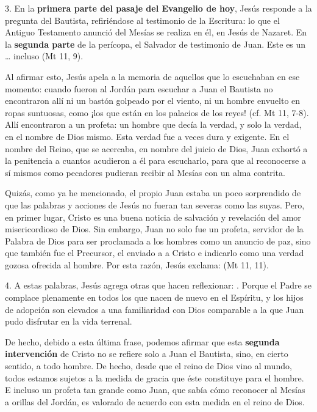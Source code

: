 \begin{body}
					3. En la \textbf{primera parte del pasaje del Evangelio de hoy}, Jesús responde a la pregunta del Bautista, refiriéndose al testimonio de la Escritura: lo que el Antiguo Testamento anunció del Mesías se realiza en él, en Jesús de Nazaret. En la \textbf{segunda parte} de la perícopa, el Salvador de testimonio de Juan. Este es un  \ldots{} incluso  (Mt 11, 9).
					
					Al afirmar esto, Jesús apela a la memoria de aquellos que lo escuchaban en ese momento: cuando fueron al Jordán para escuchar a Juan el Bautista no encontraron allí ni un bastón golpeado por el viento, ni un hombre envuelto en ropas suntuosas, como ¡los que están en los palacios de los reyes! (cf. Mt 11, 7-8). Allí encontraron a un profeta: un hombre que decía la verdad, y solo la verdad, en el nombre de Dios mismo. Esta verdad fue a veces dura y exigente. En el nombre del Reino, que se acercaba, en nombre del juicio de Dios, Juan exhortó a la penitencia a cuantos acudieron a él para escucharlo, para que al reconocerse a sí mismos como pecadores pudieran recibir al Mesías con un alma contrita.
					
					Quizás, como ya he mencionado, el propio Juan estaba un poco sorprendido de que las palabras y acciones de Jesús no fueran tan severas como las suyas. Pero, en primer lugar, Cristo es una buena noticia de salvación y revelación del amor misericordioso de Dios. Sin embargo, Juan no solo fue un profeta, servidor de la Palabra de Dios para ser proclamada a los hombres como un anuncio de paz, sino que también fue el Precursor, el enviado a  a Cristo e indicarlo como una verdad gozosa ofrecida al hombre. Por esta razón, Jesús exclama:  (Mt 11, 11).
					
					4. A estas palabras, Jesús agrega otras que hacen reflexionar: . Porque el Padre se complace plenamente en todos los que nacen de nuevo en el Espíritu, y los hijos de adopción son elevados a una familiaridad con Dios comparable a la que Juan pudo disfrutar en la vida terrenal.
					
					De hecho, debido a esta última frase, podemos afirmar que esta \textbf{segunda intervención} de Cristo no se refiere solo a Juan el Bautista, sino, en cierto sentido, a todo hombre. De hecho, desde que el reino de Dios vino al mundo, todos estamos sujetos a la medida de gracia que éste constituye para el hombre. E incluso un profeta tan grande como Juan, que sabía cómo reconocer al Mesías a orillas del Jordán, es valorado de acuerdo con esta medida en el reino de Dios.
					

\end{body}
